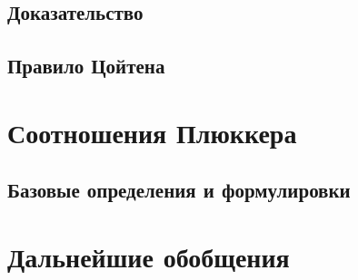\documentclass[a4paper, 12pt]{article}
\begin{document}
\subsection{Доказательство}
\subsection{Правило Цойтена}
\section{Соотношения Плюккера}
\subsection{Базовые определения и формулировки}
\section{Дальнейшие обобщения}
\end{document}
